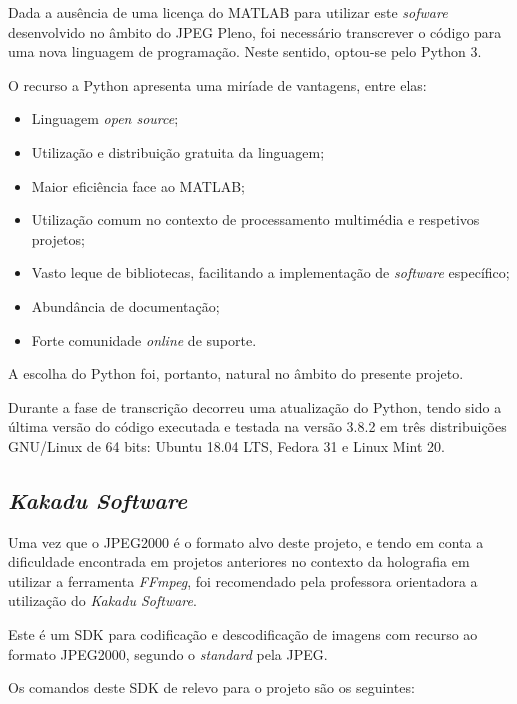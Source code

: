 Dada a ausência de uma licença do MATLAB para utilizar este \textit{sofware} desenvolvido no âmbito do JPEG Pleno, foi necessário transcrever o código para uma nova linguagem de programação. Neste sentido, optou-se pelo Python 3.


O recurso a Python apresenta uma miríade de vantagens, entre elas:
\begin{itemize}
    \item Linguagem \textit{open source};
    \item Utilização e distribuição gratuita da linguagem;
    \item Maior eficiência face ao MATLAB;
    \item Utilização comum no contexto de processamento multimédia e respetivos projetos;
    \item Vasto leque de bibliotecas, facilitando a implementação de \textit{software} específico;
    \item Abundância de documentação;
    \item Forte comunidade \textit{online} de suporte.
\end{itemize}

A escolha do Python foi, portanto, natural no âmbito do presente projeto.

Durante a fase de transcrição decorreu uma atualização do Python, tendo sido a última versão do código executada e testada na versão 3.8.2 em três distribuições GNU/Linux de 64 bits: Ubuntu 18.04 LTS, Fedora 31 e Linux Mint 20.

\subsection{\textit{Kakadu Software}}

Uma vez que o JPEG2000 é o formato alvo deste projeto, e tendo em conta a dificuldade encontrada em projetos anteriores no contexto da holografia em utilizar a ferramenta \textit{FFmpeg}, foi recomendado pela professora orientadora a utilização do \textit{Kakadu Software}.

Este é um \ac{SDK} para codificação e descodificação de imagens com recurso ao formato JPEG2000, segundo o \textit{standard} pela \ac{JPEG}.

Os comandos deste \ac{SDK} de relevo para o projeto são os seguintes:

